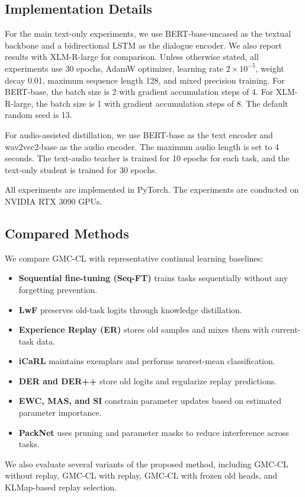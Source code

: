 \subsection{Implementation Details}
\label{subsec:implementation_details}

For the main text-only experiments, we use BERT-base-uncased as the textual backbone and a bidirectional LSTM as the dialogue encoder. We also report results with XLM-R-large for comparison. Unless otherwise stated, all experiments use 30 epochs, AdamW optimizer, learning rate $2\times10^{-5}$, weight decay 0.01, maximum sequence length 128, and mixed precision training. For BERT-base, the batch size is 2 with gradient accumulation steps of 4. For XLM-R-large, the batch size is 1 with gradient accumulation steps of 8. The default random seed is 13.

For audio-assisted distillation, we use BERT-base as the text encoder and wav2vec2-base as the audio encoder. The maximum audio length is set to 4 seconds. The text-audio teacher is trained for 10 epochs for each task, and the text-only student is trained for 30 epochs.

All experiments are implemented in PyTorch. The experiments are conducted on NVIDIA RTX 3090 GPUs.

\subsection{Compared Methods}
\label{subsec:baselines}

We compare GMC-CL with representative continual learning baselines:
\begin{itemize}
    \item \textbf{Sequential fine-tuning (Seq-FT)} trains tasks sequentially without any forgetting prevention.
    \item \textbf{LwF} preserves old-task logits through knowledge distillation.
    \item \textbf{Experience Replay (ER)} stores old samples and mixes them with current-task data.
    \item \textbf{iCaRL} maintains exemplars and performs nearest-mean classification.
    \item \textbf{DER and DER++} store old logits and regularize replay predictions.
    \item \textbf{EWC, MAS, and SI} constrain parameter updates based on estimated parameter importance.
    \item \textbf{PackNet} uses pruning and parameter masks to reduce interference across tasks.
\end{itemize}
We also evaluate several variants of the proposed method, including GMC-CL without replay, GMC-CL with replay, GMC-CL with frozen old heads, and KLMap-based replay selection.

